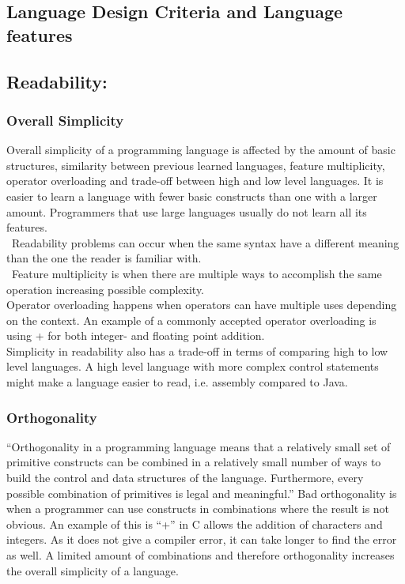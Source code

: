 \subsection{Language Design Criteria and Language features}
\label{language-design-criteria}
\label{design-criteria-theory}
\subsection*{Readability:}
\subsubsection*{Overall Simplicity}
Overall simplicity of a programming language is affected by the amount of basic structures, similarity between previous learned languages, feature multiplicity, operator overloading and trade-off between high and low level languages.
It is easier to learn a language with fewer basic constructs than one with a larger amount. Programmers that use large languages usually do not learn all its features. \\\
Readability problems can occur when the same syntax have a different meaning than the one the reader is familiar with. \\\
Feature multiplicity is when there are multiple ways to accomplish the same operation increasing possible complexity. \\
Operator overloading happens when operators can have multiple uses depending on the context. An example of a commonly accepted operator overloading is using + for both integer- and floating point addition. \\
Simplicity in readability also has a trade-off in terms of comparing high to low level languages. A high level language with more complex control statements might make a language easier to read, i.e. assembly compared to Java.

\subsubsection*{Orthogonality}
“Orthogonality in a programming language means that a relatively small set
of primitive constructs can be combined in a relatively small number of ways
to build the control and data structures of the language. Furthermore, every possible combination of primitives is legal and meaningful.”
Bad orthogonality is when a programmer can use constructs in combinations where the result is not obvious. An example of this is “+” in C allows the addition of characters and integers. As it does not give a compiler error, it can take longer to find the error as well.
A limited amount of combinations and therefore orthogonality increases the overall simplicity of a language.

